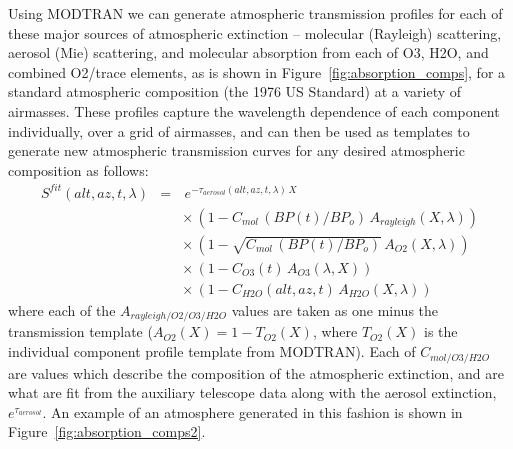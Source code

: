 \documentclass[12pt,preprint]{aastex}
\begin{document}
Using MODTRAN we can generate atmospheric transmission profiles for
each of these major sources of atmospheric extinction -- molecular
(Rayleigh) scattering, aerosol (Mie) scattering, and molecular
absorption from each of O3, H2O, and combined O2/trace elements, as is
shown in Figure~\ref{fig:absorption_comps}, for a standard atmospheric
composition (the 1976 US Standard) at a variety of airmasses. These
profiles capture the wavelength dependence of each component
individually, over a grid of airmasses, and can then be used as
templates to generate new atmospheric transmission curves for any
desired atmospheric composition as follows:
\begin{eqnarray}
S^{fit}(alt,az,t, \lambda) & = & \,e^{-\tau_{aerosol}(alt,az,t,\lambda)\,X} \nonumber \\
 & & \times \, (1 - C_{mol}\, (BP(t) / BP_o) \, A_{rayleigh}(X, \lambda)) \nonumber \\
 & & \times \, (1 - \sqrt{ C_{mol}\, (BP(t) / BP_o)} \, A_{O2}(X, \lambda)) \nonumber \\
 & & \times \, (1 - C_{O3}(t) \, A_{O3}(\lambda, X)) \nonumber \\
 & & \times \, (1 - C_{H2O}(alt,az,t)\,A_{H2O}(X, \lambda))
\label{eqn:atmo_fit}
\end{eqnarray}
where each of the $A_{rayleigh/O2/O3/H2O}$ values are taken as one
minus the transmission template ($A_{O2}(X) = 1 - T_{O2}(X)$, where
$T_{O2}(X)$ is the individual component profile template from MODTRAN). Each of
$C_{mol/O3/H2O}$ are values which describe the composition of the
atmospheric extinction, and are what are fit from the auxiliary
telescope data along with the aerosol extinction,
$e^{\tau_{aerosol}}$. An example of an atmosphere generated in this
fashion is shown in Figure~\ref{fig:absorption_comps2}.
\end{document}
